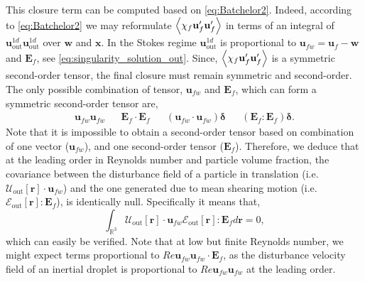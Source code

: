 This closure term can be computed based on \ref{eq:Batchelor2}. 
Indeed, according to \ref{eq:Batchelor2} we may reformulate $\left<\chi_f \textbf{u}_f'\textbf{u}_f'\right>$ in terms of an integral of $\textbf{u}_\text{out}^{1d}\textbf{u}_\text{out}^{1d}$ over $\textbf{w}$ and $\textbf{x}$. 
In the Stokes regime $\textbf{u}_\text{out}^{1d}$ is proportional to $\textbf{u}_{fw} = \textbf{u}_f - \textbf{w}$ and $\textbf{E}_f$, see \ref{eq:singularity_solution_out}. 
Since, $\left<\chi_f \textbf{u}_f'\textbf{u}_f'\right>$ is a symmetric second-order tensor, the final closure must remain symmetric and second-order.
The only possible combination of tensor, $\textbf{u}_{fw}$ and $\textbf{E}_f$, which can form a symmetric second-order tensor are, 
\begin{align}
    \textbf{u}_{fw}
    \textbf{u}_{fw}
    &&
    \textbf{E}_f\cdot \textbf{E}_f
    && 
    (\textbf{u}_{fw}\cdot 
    \textbf{u}_{fw})\bm\delta
    &&
    (\textbf{E}_f : \textbf{E}_f)\bm\delta. 
\end{align}
Note that it is impossible to obtain a second-order tensor based on combination of one vector ($\textbf{u}_{fw}$), and one second-order tensor ($\textbf{E}_f$). 
Therefore, we deduce that at the leading order in Reynolds number and particle volume fraction, the covariance between the disturbance field of a particle in translation (i.e. $\mathcal{U}_\text{out}[\textbf{r}] \cdot \textbf{u}_{fw}$) and the one generated due to mean shearing motion (i.e. $\mathcal{E}_\text{out}[\textbf{r}]: \textbf{E}_{f}$), is identically null. 
Specifically it means that,
\begin{equation}
    \int_{\mathbb{R}^3} \mathcal{U}_\text{out}[\textbf{r}] \cdot \textbf{u}_{fw}
     \mathcal{E}_\text{out}[\textbf{r}]: \textbf{E}_{f} d\textbf{r} = 0,
     \label{eq:symmetryargs}
\end{equation}
which can easily be verified. 
Note that at low but finite Reynolds number, we might expect terms proportional to $Re \textbf{u}_{fw}\textbf{u}_{fw} \cdot \textbf{E}_f$, as the disturbance velocity field of an inertial droplet is proportional to $Re \textbf{u}_{fw}\textbf{u}_{fw}$ at the leading order. 

